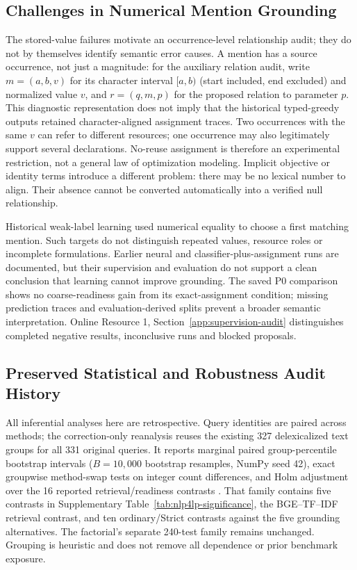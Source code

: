 \subsection{Challenges in Numerical Mention Grounding}
\label{app:occurrence-boundary}

The stored-value failures motivate an occurrence-level relationship audit; they do not by themselves identify semantic error causes. A mention has a source occurrence, not just a magnitude: for the auxiliary relation audit, write $m=(a,b,v)$ for its character interval $[a,b)$ (start included, end excluded) and normalized value $v$, and $r=(q,m,p)$ for the proposed relation to parameter $p$. This diagnostic representation does not imply that the historical typed-greedy outputs retained character-aligned assignment traces. Two occurrences with the same $v$ can refer to different resources; one occurrence may also legitimately support several declarations. No-reuse assignment is therefore an experimental restriction, not a general law of optimization modeling. Implicit objective or identity terms introduce a different problem: there may be no lexical number to align. Their absence cannot be converted automatically into a verified null relationship.

Historical weak-label learning used numerical equality to choose a first matching mention. Such targets do not distinguish repeated values, resource roles or incomplete formulations. Earlier neural and classifier-plus-assignment runs are documented, but their supervision and evaluation do not support a clean conclusion that learning cannot improve grounding. The saved P0 comparison shows no coarse-readiness gain from its exact-assignment condition; missing prediction traces and evaluation-derived splits prevent a broader semantic interpretation. Online Resource 1, Section~\ref{app:supervision-audit} distinguishes completed negative results, inconclusive runs and blocked proposals.


\subsection{Preserved Statistical and Robustness Audit History}
\label{app:statistical-history}

All inferential analyses here are retrospective. Query identities are paired across methods; the correction-only reanalysis reuses the existing 327 delexicalized text groups for all 331 original queries. It reports marginal paired group-percentile bootstrap intervals ($B=10{,}000$ bootstrap resamples, NumPy seed 42), exact groupwise method-swap tests on integer count differences, and Holm adjustment over the 16 reported retrieval/readiness contrasts \cite{holm1979followup}. That family contains five contrasts in Supplementary Table~\ref{tab:nlp4lp-significance}, the BGE--TF--IDF retrieval contrast, and ten ordinary/Strict contrasts against the five grounding alternatives. The factorial's separate 240-test family remains unchanged. Grouping is heuristic and does not remove all dependence or prior benchmark exposure.

